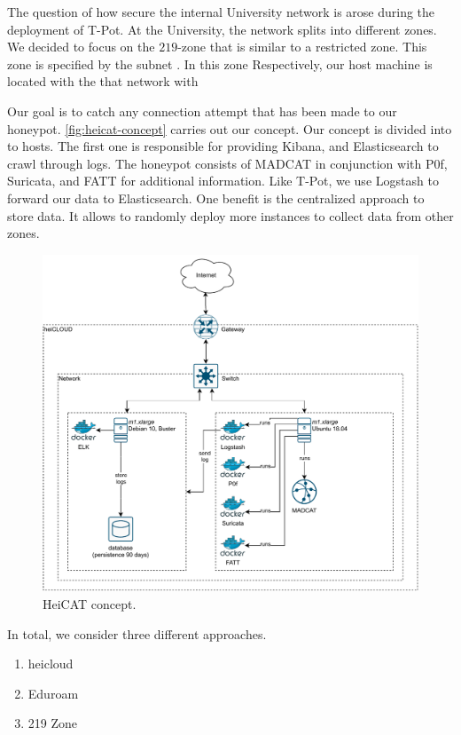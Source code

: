The question of how secure the internal University network is arose during the deployment of T-Pot.
At the University, the network splits into different zones.
We decided to focus on the $219$-zone that is similar to a restricted zone.
This zone is specified by the subnet .
In this zone 
Respectively, our host machine is located with the that network with 

Our goal is to catch any connection attempt that has been made to our honeypot.
\autoref{fig:heicat-concept} carries out our concept.
Our concept is divided into to hosts.
The first one is responsible for providing Kibana, and Elasticsearch to crawl through logs.
The honeypot consists of MADCAT in conjunction with P0f, Suricata, and FATT for additional information.
Like T-Pot, we use Logstash to forward our data to Elasticsearch.
One benefit is the centralized approach to store data.
It allows to randomly deploy more instances to collect data from other zones.

\begin{figure}[ht]
    \centering
    \includegraphics[width=\textwidth]{figures/heicat-conecpt.pdf}
    \caption[HeiCAT concept]{HeiCAT concept.}
    \label{fig:heicat-concept}
\end{figure}

In total, we consider three different approaches.
\begin{enumerate}
    \item heicloud
    \item Eduroam
    \item 219 Zone
\end{enumerate}

